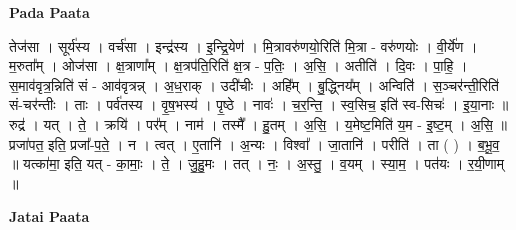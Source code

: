 \documentclass[17pt]{extarticle}
\begin{document}
\textbf{Pada Paata} \newline

तेज॑सा । सूर्य॑स्य । वर्च॑सा । इन्द्र॑स्य । इ॒न्द्रि॒येण॑ । मि॒त्रावरु॑णयो॒रिति॑ मि॒त्रा - वरु॑णयोः । वी॒र्ये॑ण । म॒रुता᳚म् । ओज॑सा । क्ष॒त्राणा᳚म् । क्ष॒त्रप॑ति॒रिति॑ क्ष॒त्र - प॒तिः॒ । अ॒सि॒ । अतीति॑ । दि॒वः । पा॒हि॒ । स॒माव॑वृत्र॒न्निति॑ सं - आव॑वृत्रन्न् । अ॒ध॒राक् । उदी॑चीः । अहि᳚म् । बु॒द्ध्निय᳚म् । अन्विति॑॑ । स॒ञ्चर॑न्ती॒रिति॑ सं-चर॑न्तीः । ताः । पर्व॑तस्य । वृ॒ष॒भस्य॑ । पृ॒ष्ठे । नावः॑ । च॒र॒न्ति॒ । स्व॒सिच॒ इति॑ स्व-सिचः॑ । इ॒या॒नाः ॥ रुद्र॑ । यत् । ते॒ । क्रयि॑ । पर᳚म् । नाम॑ । तस्मै᳚ । हु॒तम् । अ॒सि॒ । य॒मेष्ट॒मिति॑ य॒म - इ॒ष्ट॒म् । अ॒सि॒ ॥ प्रजा॑पत॒ इति॒ प्रजा᳚-प॒ते॒ । न । त्वत् । ए॒तानि॑ । अ॒न्यः । विश्वा᳚ । जा॒तानि॑ । परीति॑ । ता ( ) । ब॒भू॒व॒ ॥ यत्का॑मा॒ इति॒ यत् - का॒माः॒ । ते॒ । जु॒हु॒मः । तत् । नः॒ । अ॒स्तु॒ । व॒यम् । स्या॒म॒ । पत॑यः । र॒यी॒णाम् ॥  \newline



\textbf{Jatai Paata} \newline
\end{document}

